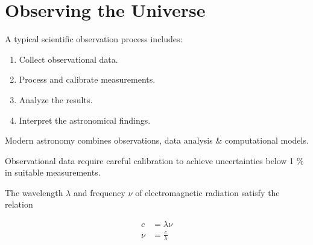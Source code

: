 \section{Observing the Universe}
A typical scientific observation process includes:
\begin{enumerate}
    \item Collect observational data.
    \item Process and calibrate measurements.
    \item Analyze the results.
    \item Interpret the astronomical findings.
\end{enumerate}

Modern astronomy combines observations, data analysis \& computational models.

Observational data require careful calibration to achieve uncertainties below 1 \% in suitable measurements.

The wavelength $\lambda$ and frequency $\nu$ of electromagnetic radiation satisfy the relation

\begin{equation}
    \begin{aligned}
        c &= \lambda \nu \\
        \nu &= \frac{c}{\lambda}
    \end{aligned}
    \label{eq:frequency}
\end{equation}